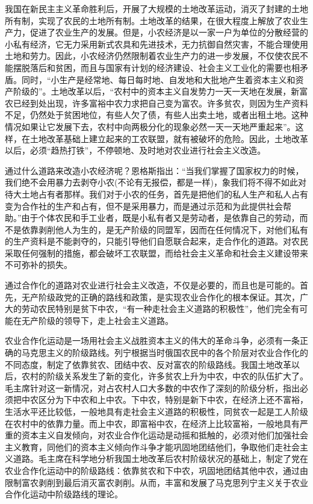 \documentclass{book}
\begin{document}
我国在新民主主义革命胜利后，开展了大规模的土地改革运动，消灭了封建的土地所有制，实现了农民的土地所有制。土地改革的结果，在很大程度上解放了农业生产力，促进了农业生产的发展。但是，小农经济是以一家一户为单位的分散经营的小私有经济，它无力采用新式农具和先进技术，无力抗御自然灾害，不能合理使用土地和劳力。因此，小农经济仍然限制着农业生产力的进一步发展，不仅使农民不能摆脱落后和贫困，而且与国家有计划的经济建设、社会主义工业化的需要也相矛盾。同时，“小生产是经常地、每日每时地、自发地和大批地产生着资本主义和资产阶级的”。土地改革以后，“农村中的资本主义自发势力一天一天地在发展，新富农已经到处出现，许多富裕中农力求把自己变为富农。许多贫农，则因为生产资料不足，仍然处于贫困地位，有些人欠了债，有些人出卖土地，或者出租土地。这种情况如果让它发展下去，农村中向两极分化的现象必然一天一天地严重起来”。这样，在土地改革基础上建立起来的工农联盟，就有被破坏的危险。因此，土地改革以后，必须“趋热打铁”，不停顿地、及时地对农业进行社会主义改造。

通过什么道路来改造小农经济呢？恩格斯指出：“当我们掌握了国家权力的时候，我们绝不会用暴力去剥夺小农(不论有无报偿，都是一样)，象我们将不得不如此对待大土地占有者那样。我们对于小农的任务，首先是把他们的私人生产和私人占有变为合作社的生产和占有，但不是采用暴力，而是通过示范和为此提供社会帮助。”由于个体农民和手工业者，既是小私有者又是劳动者，是依靠自己的劳动，而不是依靠剥削他人为生的，是无产阶级的同盟军，因而在任何情况下，对他们私有的生产资料是不能剥夺的，只能引导他们自愿联合起来，走合作化的道路。对农民采取任何强制的措施，都会破坏工农联盟，而给社会主义革命和社会主义建设带来不可弥补的损失。

通过合作化的道路对农业进行社会主义改造，不仅是必要的，而且也是可能的。首先，无产阶级政党的正确的路线和政策，是实现农业合作化的根本保证。其次，广大的劳动农民特别是贫下中农，“有一种走社会主义道路的积极性”，他们完全有可能在无产阶级的领导下，走上社会主义道路。

农业合作化运动是一场用社会主义战胜资本主义的伟大的革命斗争，必须有一条正确的马克思主义的阶级路线。列宁根据当时俄国农民中的各个阶层对农业合作化的不同态度，制定了依靠贫农、团结中农、反对富农的阶级路线。我国土地改革以后，农村的阶级关系发生了新的变化，许多贫农上升为中农，中农的队伍扩大了。毛主席针对这一新情况，对占农村人口大多数的中农作了深刻的阶级分析，指出必须把中农区分为下中农和上中农。下中农，特别是新下中农，在经济上还不富裕，生活水平还比较低，一般地具有走社会主义道路的积极性，同贫农一起是工人阶级在农村中的依靠力量。而上中农，即富裕中农，在经济上比较富裕，一般地具有严重的资本主义自发倾向，对农业合作化运动是动摇和抵触的，必须对他们加强社会主义教育，同他们的资本主义倾向作斗争才能巩固地团结他们，争取他们走社会主义道路。毛主席在科学地分析我国土地改革后农村阶级状况的基础上，制定了党在农业合作化运动中的阶级路线：依靠贫农和下中农，巩固地团结其他中农，通过由限制富农剥削到最后消灭富农剥削。从而，丰富和发展了马克思列宁主义关于农业合作化运动中阶级路线的理论。
\end{document}
